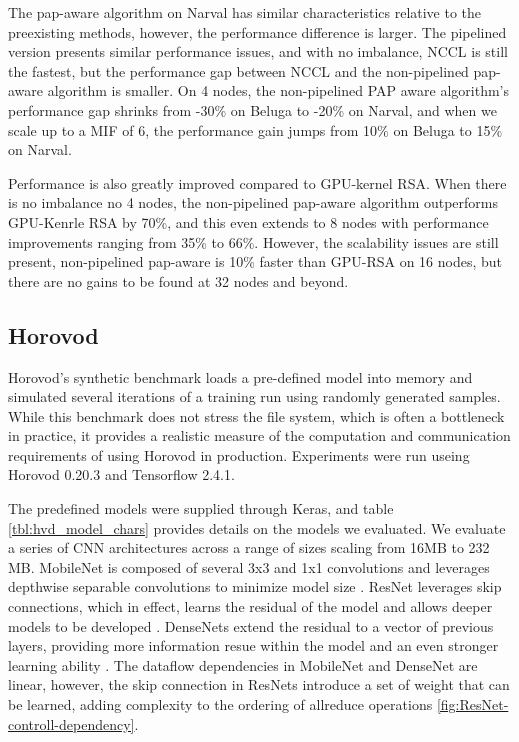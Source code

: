 The pap-aware algorithm on Narval has similar characteristics relative to the preexisting methods, however, the performance difference is larger.
The pipelined version presents similar performance issues, and with no imbalance, NCCL is still the fastest, but the performance gap between NCCL and the non-pipelined pap-aware algorithm is smaller.
On 4 nodes, the non-pipelined PAP aware algorithm's performance gap shrinks from -30\% on Beluga to -20\% on Narval, and when we scale up to a MIF of 6, the performance gain jumps from 10\% on Beluga to 15\% on Narval.

Performance is also greatly improved compared to GPU-kernel RSA.
When there is no imbalance no 4 nodes, the non-pipelined pap-aware algorithm outperforms GPU-Kenrle RSA by 70\%, and this even extends to 8 nodes with performance improvements ranging from 35\% to 66\%.
However, the scalability issues are still present, non-pipelined pap-aware is 10\% faster than GPU-RSA on 16 nodes, but there are no gains to be found at 32 nodes and beyond.

\subsection{Horovod}\label{sec:CH5-eval-horovod}
Horovod's synthetic benchmark loads a pre-defined model into memory and simulated several iterations of a training run using randomly generated samples.
While this benchmark does not stress the file system, which is often a bottleneck in practice, it provides a realistic measure of the computation and communication requirements of using Horovod in production.
Experiments were run useing Horovod 0.20.3 and Tensorflow 2.4.1.



The predefined models were supplied through Keras, and table \ref{tbl:hvd_model_chars} provides details on the models we evaluated.
We evaluate a series of CNN architectures across a range of sizes scaling from 16MB to 232 MB.
MobileNet is composed of several 3x3 and 1x1 convolutions and leverages depthwise separable convolutions to minimize model size \cite{Howard2017MobileNet}.
ResNet leverages skip connections, which in effect, learns the residual of the model and allows deeper models to be developed \cite{He2015ResNet}.
DenseNets extend the residual to a vector of previous layers, providing more information resue within the model and an even stronger learning ability \cite{Huang2016DenseNet}.
The dataflow dependencies in MobileNet and DenseNet are linear, however, the skip connection in ResNets introduce a set of weight that can be learned, adding complexity to the ordering of allreduce operations \ref{fig:ResNet-controll-dependency}.

